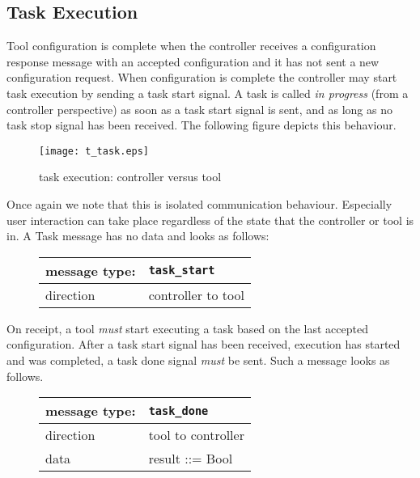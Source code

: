 \documentclass{article}
\newcommand{\msg}[1]{\texttt{#1}}
\begin{document}
  \subsection{Task Execution} \label{ss::task_execution}

   \noindent Tool configuration is complete when the controller receives a
   configuration response message with an accepted configuration and it has not
   sent a new configuration request.  When configuration is complete the
   controller may start task execution by sending a task start signal. A task
   is called \textit{in progress} (from a controller perspective) as soon as a
   task start signal is sent, and as long as no task stop signal has been
   received. The following figure depicts this behaviour.

   \begin{figure}[H]
    \begin{center}
     \texttt{[image: t\_task.eps]}
    \end{center}
    \vspace{-0.3cm}
    \caption{task execution: controller versus tool}
   \end{figure}

   \noindent Once again we note that this is isolated communication behaviour.
   Especially user interaction can take place regardless of the state that the
   controller or tool is in. A Task message has no data and looks as follows:

   \begin{figure}[H]
    \begin{center}
     \begin{tabular}{|ll|}
      \hline
       message type:   & \msg{task\_start} \\
      \hline
       direction       & controller to tool \\
      \hline
     \end{tabular}
    \end{center}
   \end{figure}
   \vspace{-0.3cm}

   \noindent On receipt, a tool \emph{must} start executing a task based on the
   last accepted configuration. After a task start signal has been received,
   execution has started and was completed, a task done signal \emph{must} be
   sent. Such a message looks as follows.

   \begin{figure}[H]
    \begin{center}
     \begin{tabular}{|ll|}
      \hline
       message type:   & \msg{task\_done} \\
      \hline
       direction       & tool to controller \\
       data            & result ::= Bool \\
      \hline
     \end{tabular}
    \end{center}
   \end{figure}
   \vspace{-0.3cm}
\end{document}
